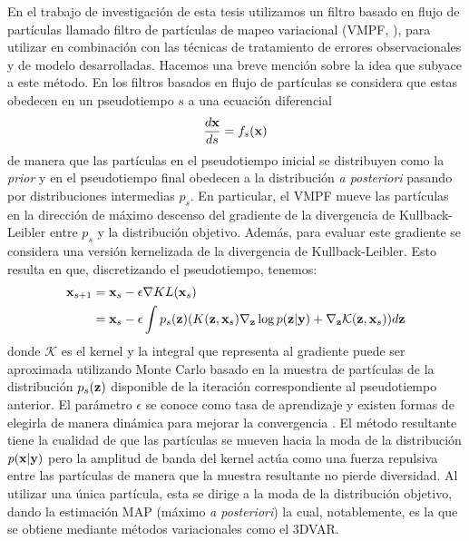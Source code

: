 En el trabajo de investigación de esta tesis utilizamos un filtro basado en flujo de partículas llamado filtro de partículas de mapeo variacional (VMPF, \cite{Pulido2019}), para utilizar en combinación con las técnicas de tratamiento de errores observacionales y de modelo desarrolladas. Hacemos una breve mención sobre la idea que subyace a este método. En los filtros basados en flujo de partículas se considera que estas obedecen en un pseudotiempo $s$ a una ecuación diferencial
\begin{align*}
    \frac{d\mathbf{x}}{ds} = f_s(\mathbf{x})
\end{align*}
de manera que las partículas en el pseudotiempo inicial se distribuyen como la \textit{prior} y en el pseudotiempo final obedecen a la distribución \textit{a posteriori} pasando por distribuciones intermedias $p_s$. En particular, el VMPF mueve las partículas en la dirección de máximo descenso del gradiente de la divergencia de Kullback-Leibler entre $p_s$ y la distribución objetivo. Además, para evaluar este gradiente se considera una versión kernelizada de la divergencia de Kullback-Leibler. Esto resulta en que, discretizando el pseudotiempo, tenemos:
\begin{align*}
    \mathbf{x}_{s+1} &= \mathbf{x}_s - \epsilon \nabla KL(\mathbf{x}_s) \\
    &= \mathbf{x}_s - \epsilon \int p_s(\mathbf{z}) (K(\mathbf{z}, \mathbf{x}_s) \nabla_{\mathbf{z}} \log p(\mathbf{z} | \mathbf{y}) + \nabla_{\mathbf{z}} \mathcal{K}(\mathbf{z}, \mathbf{x}_s)) d\mathbf{z}
\end{align*}
donde $\mathcal{K}$ es el kernel y la integral que representa al gradiente puede ser aproximada utilizando Monte Carlo basado en la muestra de partículas de la distribución $p_s(\mathbf{z})$ disponible de la iteración correspondiente al pseudotiempo anterior. El parámetro $\epsilon$ se conoce como tasa de aprendizaje y existen formas de elegirla de manera dinámica para mejorar la convergencia \citep{Zeiler2012}. El método resultante tiene la cualidad de que las partículas se mueven hacia la moda de la distribución $p(\mathbf{x} | \mathbf{y})$ pero la amplitud de banda del kernel actúa como una fuerza repulsiva entre las partículas \citep{Liu2016} de manera que la muestra resultante no pierde diversidad. Al utilizar una única partícula, esta se dirige a la moda de la distribución objetivo, dando la estimación MAP (máximo \textit{a posteriori}) la cual, notablemente, es la que se obtiene mediante métodos variacionales como el 3DVAR.


